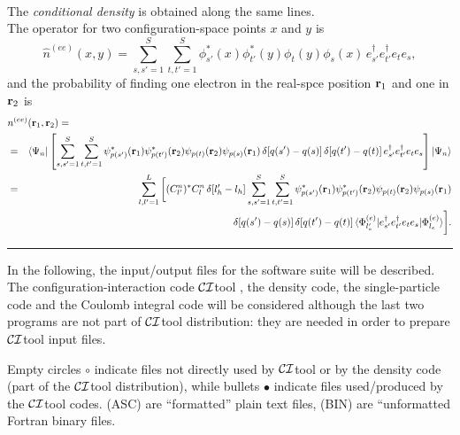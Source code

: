 \documentclass[12pt,twoside]{article}
\newcommand*{\CItool}[0]{{$\cal CI$}\textsf{tool} }
\begin{document}
\

The \emph{conditional density} is obtained along the same lines. \\
The operator for two configuration-space points $x$ and $y$ is
\begin{equation} \label{conditionaldensity}
\hat n^{(ee)}(x,y) = 
\sum_{s, s' =1}^S \sum_{t, t' =1}^S \phi^*_{s'}(x)  \phi^*_{t'}(y) \phi_{t}(y) \phi_{s}(x) \,
e^\dagger_{s'} e^\dagger_{t'} e_{t} e_{s} ,
\end{equation}
and the probability of finding one electron
in the real-spce position ${\bf r}_1$ and one in ${\bf r}_2$ is
\begin{eqnarray} \label{conditionaldensity_r}
\lefteqn{ n^{(ee)}({\bf r}_1,{\bf r}_2) = }
\\ \nonumber
&=& \langle \Psi_n | \left[ \sum_{s, s' =1}^S \sum_{t, t' =1}^S 
\psi^*_{p(s')}({\bf r}_1) \psi^*_{p(t')}({\bf r}_2)
\psi_{p(t)}({\bf r}_2) \psi_{p(s)}({\bf r}_1) \, 
\delta[q(s')-q(s)] \, \delta[q(t')-q(t)]  \,  
e^\dagger_{s'} e^\dagger_{t'} e_{t} e_{s} 
\right] | \Psi_n \rangle
\\  \nonumber
&=& \sum_{l, l' = 1}^L  \bigg[ 
(C^n_{l'})^* C^n_l \, \delta[l_h'-l_h] \sum_{s, s' = 1}^S \sum_{t, t' = 1}^S 
\psi^*_{p(s')}({\bf r}_1) \psi^*_{p(t')}({\bf r}_2)
\psi_{p(t)}({\bf r}_2) \psi_{p(s)}({\bf r}_1)
\\ \nonumber
&& \delta[q(s')-q(s)] \, \delta[q(t')-q(t)]  \,  
\langle\Phi^{(e)}_{l'_e}| 
e^\dagger_{s'} e^\dagger_{t'} e_{t} e_{s} 
|\Phi^{(e)}_{l_e}\rangle  \bigg] .
\end{eqnarray}




\vspace{4mm}
\begin{center}
\rule{0.8\textwidth}{1pt}
\end{center}
\vspace{4mm}

In the following, the input/output files for the software suite will
be described.  The configuration-interaction code \CItool, the density
code, the single-particle code and the Coulomb integral code will be
considered although the last two programs are not part of \CItool
distribution: they are needed in order to prepare \CItool input files.

Empty circles $\circ$ indicate files not directly used by
\CItool or by the density code (part of the \CItool distribution),
while bullets $\bullet$ indicate files used/produced by the \CItool
codes. \textsf{(ASC)} are ``formatted'' plain text files, \textsf{(BIN)} 
are ``unformatted Fortran binary files.
\end{document}
